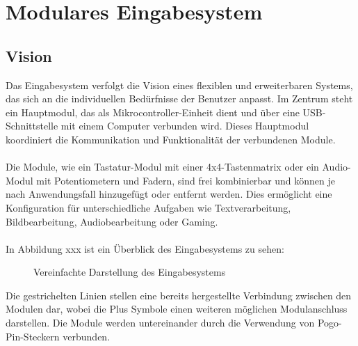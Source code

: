 \chapter{Modulares Eingabesystem}
\section{Vision}
Das Eingabesystem verfolgt die Vision eines flexiblen und erweiterbaren Systems, das sich an die individuellen Bedürfnisse der Benutzer anpasst. Im Zentrum steht ein Hauptmodul, das als Mikrocontroller-Einheit dient und über eine USB-Schnittstelle mit einem Computer verbunden wird. Dieses Hauptmodul koordiniert die Kommunikation und Funktionalität der verbundenen Module.
\\
\\
Die Module, wie ein Tastatur-Modul mit einer 4x4-Tastenmatrix oder ein Audio-Modul mit Potentiometern und Fadern, sind frei kombinierbar und können je nach Anwendungsfall hinzugefügt oder entfernt werden. Dies ermöglicht eine Konfiguration für unterschiedliche Aufgaben wie Textverarbeitung, Bildbearbeitung, Audiobearbeitung oder Gaming.
\\
\\
In Abbildung xxx ist ein Überblick des Eingabesystems zu sehen:
\begin{figure}[H]
    \centering    
    \caption{Vereinfachte Darstellung des Eingabesystems}
    \label{A3TPHP}
\end{figure}
\noindent Die gestrichelten Linien stellen eine bereits hergestellte Verbindung zwischen den Modulen dar, wobei die \glqq Plus\grqq{} Symbole einen weiteren möglichen Modulanschluss darstellen. Die Module werden untereinander durch die Verwendung von Pogo-Pin-Steckern verbunden. %
